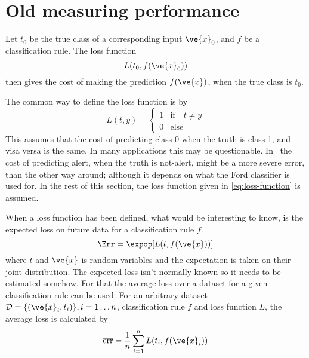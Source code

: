 \section{Old measuring performance}
\begin{definition}
    Let $t_0$ be the true class of a corresponding input $\ve{x}_0$, and $f$ be a classification rule. The loss function
    \[
        L(t_0, f(\ve{x}_0))
    \]
    then gives the cost of making the prediction $f(\ve{x})$, when the true class is $t_0$.
\end{definition}
The common way to define the loss function is by
\begin{equation}\label{eq:loss-function}
    L(t, y) = \begin{cases}
        1 & \text{if}\quad t\neq y \\
        0 & \text{else}
    \end{cases}
\end{equation}
This assumes that the cost of predicting class 0 when the truth is class 1, and visa versa is the same. In many applications this may be questionable. In \TFC\ the cost of predicting alert, when the truth is not-alert, might be a more severe error, than the other way around; although it depends on what the Ford classifier is used for. In the rest of this section, the loss function given in \eqref{eq:loss-function} is assumed. \par
When a loss function has been defined, what would be interesting to know, is the expected loss on future data for a classification rule $f$.
\[
    \Err = \expop [L(t, f(\ve{x}))]
\]
where $t$ and $\ve{x}$ is random variables and the expectation is taken on their joint distribution. The expected loss isn't normally known so it needs to be estimated somehow. For that the average loss over a dataset for a given classification rule can be used. For an arbitrary dataset $\mathcal{D}=\{(\ve{x}_i, t_i)\}, i=1\dots n$, classification rule $f$ and loss function $L$, the average loss is calculated by
\[
    \overline{\text{err}} = \frac{1}{n}\sum_{i=1}^n L(t_i, f(\ve{x}_i))
\]

